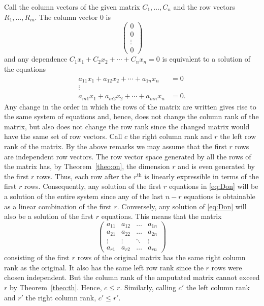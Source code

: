 \documentclass[10pt,leqno]{article}
\theoremstyle{definition}
\begin{document}
Call the column vectors of the given matrix $C_1, \ldots, C_n$ and the row vectors $R_1, \ldots, R_m$.
The column vector $0$ is
\[
\begin{pmatrix}
0 \\ 0 \\ \vdots \\ 0
\end{pmatrix}
\]
and any dependence $C_1 x_1 + C_2 x_2 + \cdots + C_n x_n = 0$ is equivalent to a solution of the equations
\begin{equation}
\label{eq:Don}
\begin{aligned}
a_{11}x_1 + a_{12}x_2 + \cdots + a_{1n}x_n &= 0
\\
\vdots &
\\
a_{m1}x_1 + a_{m2}x_2 + \cdots + a_{mn}x_n &= 0.
\end{aligned}
\end{equation}
Any change in the order in which the rows of the matrix are written gives rise to the same system of equations and, hence, does not change the column rank of the matrix, but also does not change the row rank since the changed matrix would have the same set of row vectors.
Call $c$ the right column rank and $r$ the left row rank of the matrix.
By the above remarks we may assume that the first $r$ rows are independent row vectors.
The row vector space generated by all the rows of the matrix has, by Theorem~\ref{theo:on}, the dimension $r$ and is even generated by the first $r$ rows.
Thus, each row after the $r^{\text{th}}$ is linearly expressible in terms of the first $r$ rows.
Consequently, any solution of the first $r$ equations in \eqref{eq:Don} will be a solution of the entire system since any of the last $n-r$ equations is obtainable as a linear combination of the first $r$.
Conversely, any solution of \eqref{eq:Don} will also be a solution of the first $r$ equations.
This means that the matrix
\[
\begin{pmatrix}
a_{11} & a_{12} & \ldots & a_{1n}
\\
a_{21} & a_{22} & \ldots & a_{2n}
\\
\vdots & \vdots & \ddots & \vdots
\\
a_{r1} & a_{r2} & \ldots & a_{rn}
\end{pmatrix}
\]
consisting of the first $r$ rows of the original matrix has the same right column rank as the original.
It also has the same left row rank since the $r$ rows were chosen independent.
But the column rank of the amputated matrix cannot exceed $r$ by Theorem~\ref{theo:th}.
Hence, $c \leq r$.
Similarly, calling $c'$ the left column rank and $r'$ the right column rank, $c' \leq r'$.
\end{document}
